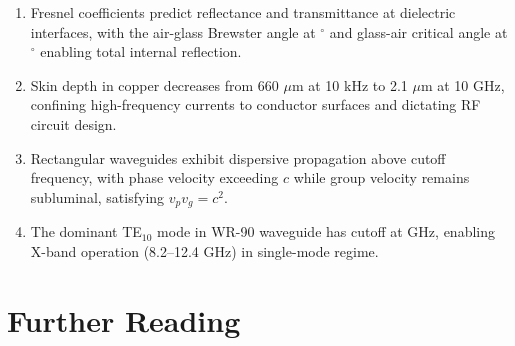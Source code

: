 \documentclass[a4paper, 11pt]{article}
\begin{document}
\begin{enumerate}
\item Fresnel coefficients predict reflectance and transmittance at dielectric interfaces,
with the air-glass Brewster angle at $^\circ$
and glass-air critical angle at $^\circ$
enabling total internal reflection.

\item Skin depth in copper decreases from 660 $\mu$m at 10 kHz to 2.1 $\mu$m at 10 GHz,
confining high-frequency currents to conductor surfaces and dictating RF circuit design.

\item Rectangular waveguides exhibit dispersive propagation above cutoff frequency, with
phase velocity exceeding $c$ while group velocity remains subluminal, satisfying
$v_p v_g = c^2$.

\item The dominant TE$_{10}$ mode in WR-90 waveguide has cutoff at
 GHz, enabling X-band operation (8.2--12.4 GHz) in single-mode regime.
\end{enumerate}

\section*{Further Reading}
\end{document}
